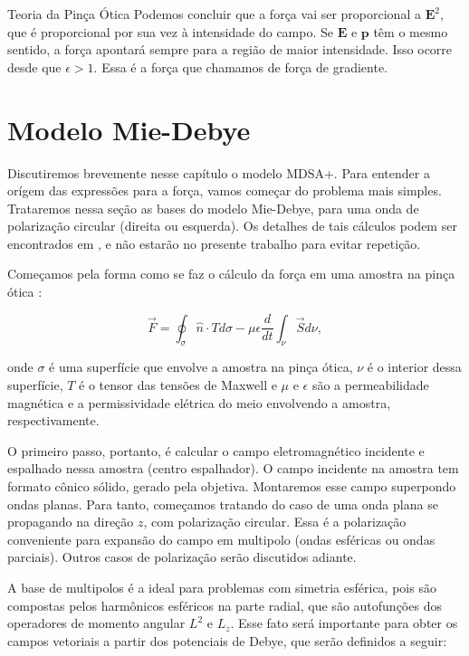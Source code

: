 \begin{chapter}{Teoria da Pinça Ótica}
Podemos concluir que a força vai ser proporcional a ${\mathbf E}^2$, que é proporcional por sua vez à intensidade do campo. Se ${\mathbf E}$ e ${\mathbf p}$ têm o mesmo sentido, a força apontará sempre para a região de maior intensidade. Isso ocorre desde que $\epsilon>1$. Essa é a força que chamamos de força de gradiente.

\section{Modelo Mie-Debye}
\label{MD}

\hspace{5 mm}Discutiremos brevemente nesse capítulo o modelo MDSA+. Para entender a orígem das expressões para a força, vamos começar do problema mais simples. Trataremos nessa seção as bases do modelo Mie-Debye, para uma onda de polarização circular (direita ou esquerda). Os detalhes de tais cálculos podem ser encontrados em \cite{Mazolli}, e não estarão no presente trabalho para evitar repetição. 

Começamos pela forma como se faz o cálculo da força em uma amostra na pinça ótica \cite{Jackson1998}:

\begin{equation}
\vec{F} = \oint_{\sigma} \hat{n} \cdot T d \sigma - \mu \epsilon \frac{d}{dt} \int_{\nu} \vec{S} d \nu,
\label{2_F}
\end{equation}

onde $\sigma$ é uma superfície que envolve a amostra na pinça ótica, $\nu$ é o interior dessa superfície, $T$ é o tensor das tensões de Maxwell e $\mu$ e $\epsilon$ são a permeabilidade magnética e a permissividade elétrica do meio envolvendo a amostra, respectivamente. 

O primeiro passo, portanto, é calcular o campo eletromagnético incidente e espalhado nessa amostra (centro espalhador). O campo incidente na amostra tem formato cônico sólido, gerado pela objetiva. Montaremos esse campo superpondo ondas planas. Para tanto, começamos tratando do caso de uma onda plana se propagando na direção $z$, com polarização circular. Essa é a polarização conveniente para expansão do campo em multipolo (ondas esféricas ou ondas parciais). Outros casos de polarização serão discutidos adiante. 

A base de multipolos é a ideal para problemas com simetria esférica, pois são compostas pelos harmônicos esféricos na parte radial, que são autofunções dos operadores de momento angular $L^2$ e $L_z$. Esse fato será importante para obter os campos vetoriais a partir dos potenciais de Debye, que serão definidos a seguir: 


\end{chapter}
